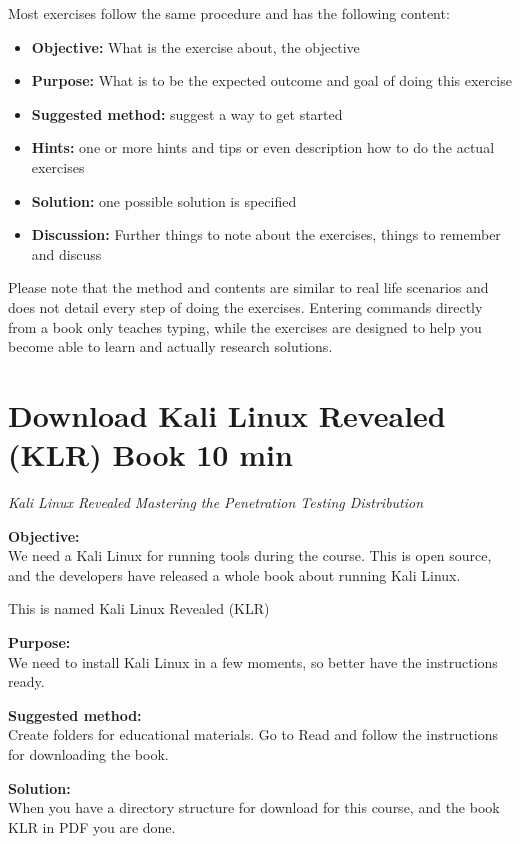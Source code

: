 \documentclass[a4paper,11pt,notitlepage]{report}
\begin{document}
Most exercises follow the same procedure and has the following content:
\begin{itemize}
\item {\bf Objective:} What is the exercise about, the objective
\item {\bf Purpose:} What is to be the expected outcome and goal of doing this exercise
\item {\bf Suggested method:} suggest a way to get started
\item {\bf Hints:} one or more hints and tips or even description how to
do the actual exercises
\item {\bf Solution:} one possible solution is specified
\item {\bf Discussion:} Further things to note about the exercises, things to remember and discuss
\end{itemize}

Please note that the method and contents are similar to real life scenarios and does not detail every step of doing the exercises. Entering commands directly from a book only teaches typing, while the exercises are designed to help you become able to learn and actually research solutions.


\chapter{Download Kali Linux Revealed (KLR) Book 10 min}
\label{ex:downloadKLR}



\emph{Kali Linux Revealed  Mastering the Penetration Testing Distribution}


{\bf Objective:}\\
We need a Kali Linux for running tools during the course. This is open source, and the developers have released a whole book about running Kali Linux.

This is named Kali Linux Revealed (KLR)

{\bf Purpose:}\\
We need to install Kali Linux in a few moments, so better have the instructions ready.

{\bf Suggested method:}\\
Create folders for educational materials. Go to 
Read and follow the instructions for downloading the book.

{\bf Solution:}\\
When you have a directory structure for download for this course, and the book KLR in PDF you are done.
\end{document}
